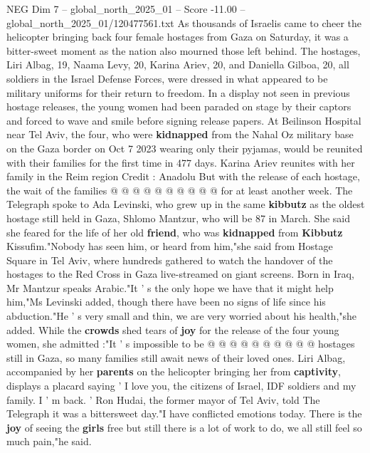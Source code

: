\begin{textsample}{NEG Dim 7 – global\_north\_2025\_01 – Score -11.00 – global\_north\_2025\_01/120477561.txt}  \label{ex:f7_neg_053}
As thousands of Israelis came to cheer the helicopter bringing back four female hostages from Gaza on Saturday, it was a bitter-sweet moment as the nation also mourned those left behind.
The hostages, Liri Albag, 19, Naama Levy, 20, Karina Ariev, 20, and Daniella Gilboa, 20, all soldiers in the Israel Defense Forces, were dressed in what appeared to be military uniforms for their return to freedom.
In a display not seen in previous hostage releases, the young women had been paraded on stage by their captors and forced to wave and smile before signing release papers.
At Beilinson Hospital near Tel Aviv, the four, who were \textbf{kidnapped} from the Nahal Oz military base on the Gaza border on Oct 7 2023 wearing only their pyjamas, would be reunited with their families for the first time in 477 days.
Karina Ariev reunites with her family in the Reim region Credit : Anadolu But with the release of each hostage, the wait of the families @ @ @ @ @ @ @ @ @ @ for at least another week.
The Telegraph spoke to Ada Levinski, who grew up in the same \textbf{kibbutz} as the oldest hostage still held in Gaza, Shlomo Mantzur, who will be 87 in March.
She said she feared for the life of her old \textbf{friend}, who was \textbf{kidnapped} from \textbf{Kibbutz} Kissufim."Nobody has seen him, or heard from him,"she said from Hostage Square in Tel Aviv, where hundreds gathered to watch the handover of the hostages to the Red Cross in Gaza live-streamed on giant screens.
Born in Iraq, Mr Mantzur speaks Arabic."It ' s the only hope we have that it might help him,"Ms Levinski added, though there have been no signs of life since his abduction."He ' s very small and thin, we are very worried about his health,"she added.
While the \textbf{crowds} shed tears of \textbf{joy} for the release of the four young women, she admitted :"It ' s impossible to be @ @ @ @ @ @ @ @ @ @ hostages still in Gaza, so many families still await news of their loved ones.
Liri Albag, accompanied by her \textbf{parents} on the helicopter bringing her from \textbf{captivity}, displays a placard saying ' I love you, the citizens of Israel, IDF soldiers and my family.
I ' m back. ' Ron Hudai, the former mayor of Tel Aviv, told The Telegraph it was a bittersweet day."I have conflicted emotions today.
There is the \textbf{joy} of seeing the \textbf{girls} free but still there is a lot of work to do, we all still feel so much pain,"he said.

\end{textsample}

